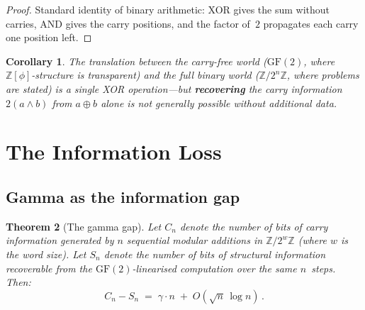 \documentclass[12pt, a4paper]{article}
\theoremstyle{plain}
\newtheorem{theorem}{Theorem}[section]
\newtheorem{corollary}[theorem]{Corollary}
\theoremstyle{definition}
\theoremstyle{remark}
\newcommand{\Z}{\mathbb{Z}}
\newcommand{\GF}{\mathrm{GF}}
\newcommand{\Zphi}{\Z[\phi]}
\begin{document}
\begin{proof}
Standard identity of binary arithmetic: XOR gives the sum without
carries, AND gives the carry positions, and the factor of~$2$
propagates each carry one position left.
\end{proof}

\begin{corollary}\label{cor:translation-cost}
The translation between the carry-free world ($\GF(2)$, where
$\Zphi$-structure is transparent) and the full binary world ($\Z/2^n\Z$,
where problems are \emph{stated}) is a single XOR operation---but
\textbf{recovering} the carry information $2(a \wedge b)$ from
$a \oplus b$ alone is not generally possible without additional data.
\end{corollary}

\section{The Information Loss}
\label{sec:info-loss}

\subsection{Gamma as the information gap}

\begin{theorem}[The gamma gap]\label{thm:gamma-gap}
Let $C_n$ denote the number of bits of carry information generated by
$n$ sequential modular additions in $\Z/2^w\Z$ (where $w$ is the word
size).  Let $S_n$ denote the number of bits of structural information
recoverable from the $\GF(2)$-linearised computation over the same
$n$~steps.  Then:
\begin{equation}\label{eq:gamma-gap}
  C_n - S_n \;=\; \gamma \cdot n \;+\; O(\sqrt{n}\,\log n)\,.
\end{equation}
\end{theorem}
\end{document}
